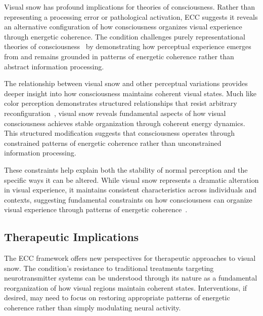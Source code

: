 Visual snow has profound implications for theories of consciousness. Rather than representing a processing error or pathological activation, ECC suggests it reveals an alternative configuration of how consciousness organizes visual experience through energetic coherence. The condition challenges purely representational theories of consciousness~\cite{Metzinger2003, van2025processes} by demonstrating how perceptual experience emerges from and remains grounded in patterns of energetic coherence rather than abstract information processing.

The relationship between visual snow and other perceptual variations provides deeper insight into how consciousness maintains coherent visual states. Much like color perception demonstrates structured relationships that resist arbitrary reconfiguration~\cite{Palmer1999, bosl2025dynamical}, visual snow reveals fundamental aspects of how visual consciousness achieves stable organization through coherent energy dynamics. This structured modification suggests that consciousness operates through constrained patterns of energetic coherence rather than unconstrained information processing.

These constraints help explain both the stability of normal perception and the specific ways it can be altered. While visual snow represents a dramatic alteration in visual experience, it maintains consistent characteristics across individuals and contexts, suggesting fundamental constraints on how consciousness can organize visual experience through patterns of energetic coherence~\cite{Thompson1995, da2024mathematical}.

\subsection*{Therapeutic Implications}

The ECC framework offers new perspectives for therapeutic approaches to visual snow. The condition's resistance to traditional treatments targeting neurotransmitter systems can be understood through its nature as a fundamental reorganization of how visual regions maintain coherent states. Interventions, if desired, may need to focus on restoring appropriate patterns of energetic coherence rather than simply modulating neural activity.

